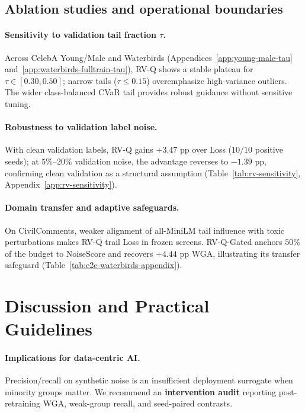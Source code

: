 \documentclass{article}
\begin{document}
\subsection{Ablation studies and operational boundaries}
\label{sec:ablations}

\paragraph{Sensitivity to validation tail fraction $\tau$.}
Across CelebA Young/Male and Waterbirds (Appendices~\ref{app:young-male-tau} and~\ref{app:waterbirds-fulltrain-tau}), RV-Q shows a stable plateau for $\tau \in [0.30, 0.50]$; narrow tails ($\tau \le 0.15$) overemphasize high-variance outliers. The wider class-balanced CVaR tail provides robust guidance without sensitive tuning.

\paragraph{Robustness to validation label noise.}
With clean validation labels, RV-Q gains $+3.47$ pp over Loss ($10/10$ positive seeds); at $5\%$--$20\%$ validation noise, the advantage reverses to $-1.39$ pp, confirming clean validation as a structural assumption (Table~\ref{tab:rv-sensitivity}, Appendix~\ref{app:rv-sensitivity}).

\paragraph{Domain transfer and adaptive safeguards.}
On CivilComments, weaker alignment of all-MiniLM tail influence with toxic perturbations makes RV-Q trail Loss in frozen screens. RV-Q-Gated anchors $50\%$ of the budget to NoiseScore and recovers $+4.44$ pp WGA, illustrating its transfer safeguard (Table~\ref{tab:e2e-waterbirds-appendix}).

\section{Discussion and Practical Guidelines}
\label{sec:discussion}

\paragraph{Implications for data-centric AI.}
Precision/recall on synthetic noise is an insufficient deployment surrogate when minority groups matter. We recommend an \textbf{intervention audit} reporting post-retraining WGA, weak-group recall, and seed-paired contrasts.
\end{document}
